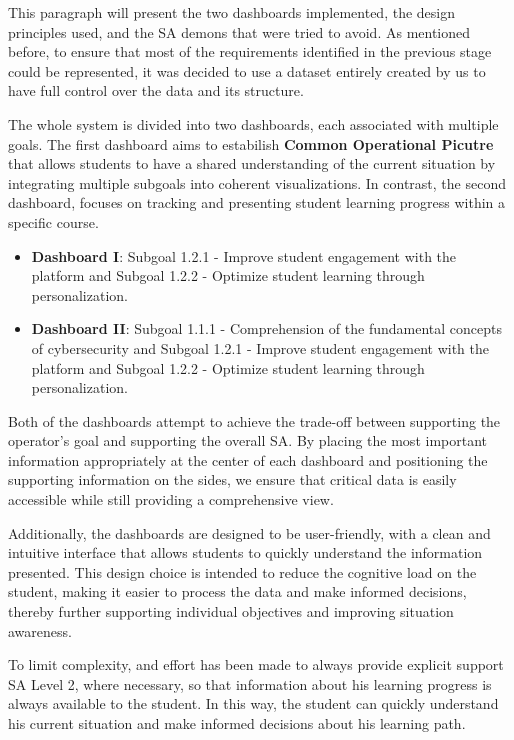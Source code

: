 This paragraph will present the two dashboards implemented, the design principles used, and the SA demons that were tried to avoid. As mentioned before, to ensure that most of the requirements identified in the previous stage could be represented, it was decided to use a dataset entirely created by us to have full control over the data and its structure.

The whole system is divided into two dashboards, each associated with multiple goals. The first dashboard aims to estabilish \textbf{Common Operational Picutre} that allows students to have a shared understanding of the current situation by integrating multiple subgoals into coherent visualizations. 
In contrast, the second dashboard, focuses on tracking and presenting student learning progress within a specific course.

\begin{itemize}
    \item \textbf{Dashboard I}: Subgoal 1.2.1 - Improve student engagement with the platform and Subgoal 1.2.2 - Optimize student learning through personalization.
    \item \textbf{Dashboard II}: Subgoal 1.1.1 - Comprehension of the fundamental concepts of cybersecurity and Subgoal 1.2.1 - Improve student engagement with the platform and Subgoal 1.2.2 - Optimize student learning through personalization.
\end{itemize} 

Both of the dashboards attempt to achieve the trade-off between supporting the operator's goal and supporting the overall SA. By placing the most important information appropriately at the center of each dashboard and positioning the supporting information on the sides, we ensure that critical data is easily accessible while still providing a comprehensive view. 

Additionally, the dashboards are designed to be user-friendly, with a clean and intuitive interface that allows students to quickly understand the information presented. This design choice is intended to reduce the cognitive load on the student, making it easier to process the data and make informed decisions, thereby further supporting individual objectives and improving situation awareness.

To limit complexity, and effort has been made to always provide explicit support SA Level 2, where necessary, so that information about his learning progress is always available to the student. In this way, the student can quickly understand his current situation and make informed decisions about his learning path.


